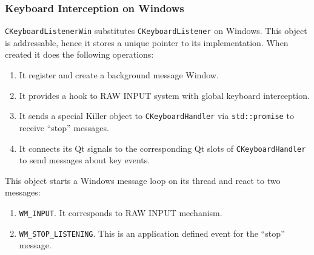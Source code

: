 \documentclass{article}
\begin{document}
\subsubsection{Keyboard Interception on Windows}

\verb"CKeyboardListenerWin" substitutes \verb"CKeyboardListener" on Windows. This object is addressable, hence it stores a unique pointer to its implementation. When created it does the following operations:
\begin{enumerate}
\item It register and create a background message Window.
\item It provides a hook to RAW INPUT system with global keyboard interception.
\item It sends a special Killer object to \verb"CKeyboardHandler" via \verb"std::promise" to receive ``stop'' messages.
\item It connects its Qt signals to the corresponding Qt slots of \verb"CKeyboardHandler" to send messages about key events.
\end{enumerate}

This object starts a Windows message loop on its thread and react to two messages:
\begin{enumerate}
\item \verb"WM_INPUT". It corresponds to RAW INPUT mechanism.
\item \verb"WM_STOP_LISTENING". This is an application defined event for the ``stop'' message.
\end{enumerate}
\end{document}
